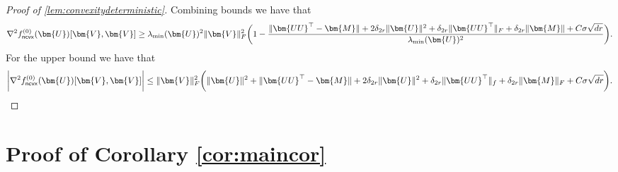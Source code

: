 \documentclass[10pt]{article}
\renewcommand{\t}{^{\top}}
\theoremstyle{definition}
\begin{document}
\begin{proof}[Proof of \cref{lem:convexitydeterministic}]
Combining bounds we have that
\begin{align}
    \nabla^2 f^{(0)}_{{\sf ncvx}} (\bm{U})[ \bm{V},\bm{V}] \geq  \lambda_{\min}(\bm{U})^2\| \bm{V}\|_F^2 \bigg( 1  - \frac{\| \bm{UU}\t - \bm{M}\| + 2 \delta_{2r} \|\bm{U}\|^2 + \delta_{2r} \| \bm{UU}\t \|_F + \delta_{2r} \| \bm{M} \| + C \sigma \sqrt{dr}}{\lambda_{\min}(\bm{U})^2} \bigg).
\end{align}
For the upper bound we have that
\begin{align}
    \bigg| \nabla^2 f^{(0)}_{{\sf ncvx}}(\bm{U})[\bm{V},\bm{V}] \bigg| \leq \|\bm{V}\|_F^2 \bigg( \| \bm{U}\|^2 + \| \bm{UU}\t - \bm{M} \| + 2 \delta_{2r} \| \bm{U}\|^2 + \delta_{2r} \| \bm{UU}\t \|_f + \delta_{2r} \| \bm{M} \|_F + C \sigma \sqrt{dr} \bigg).
\end{align}
\end{proof}

\section{Proof of Corollary \ref{cor:maincor}}

\label{sec:corproof}
\end{document}
